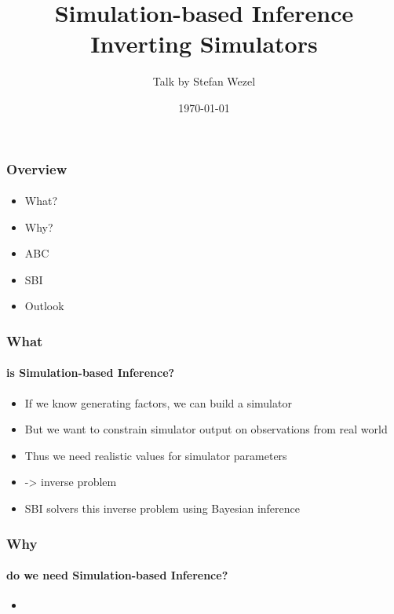 \documentclass[9pt]{beamer}
\title{Simulation-based Inference \\
	\small Inverting Simulators}
\author{Talk by Stefan Wezel}
\institute{mlcolab @ Tübingen University Cluster of Excellence}
\date{\today}
\begin{document}
	

\begin{frame}[plain]
	\titlepage
\end{frame} 



\begin{frame}
\frametitle{Overview}
\framesubtitle{}
\begin{itemize}
	\item What?
	\item Why?
	\item ABC
	\item SBI
	\item Outlook
\end{itemize}
\end{frame} 




\begin{frame}
\frametitle{What}
\framesubtitle{is Simulation-based Inference?}
\begin{itemize}
	\item If we know generating factors, we can build a simulator
	\item But we want to constrain simulator output on observations from real world
	\item Thus we need realistic values for simulator parameters
	\item -> inverse problem
	\item SBI solvers this inverse problem using Bayesian inference
\end{itemize}
\end{frame} 




\begin{frame}
\frametitle{Why}
\framesubtitle{do we need Simulation-based Inference?}
\begin{itemize}
	\item 
\end{itemize}
\end{frame} 
\end{document}
